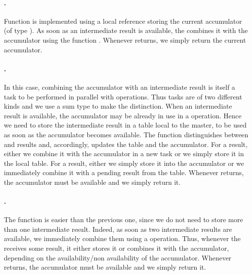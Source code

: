 \documentclass[a4paper,12pt]{article}
\begin{document}
\paragraph{.} 
Function  is implemented using a local reference
storing the current accumulator (of type ).  As soon as an
intermediate result is available, the  combines it with the
accumulator using the function . Whenever 
returns, we simply return the current accumulator.

\paragraph{.}
In this case, combining the accumulator with an intermediate result is
itself a task to be performed in parallel with  operations.
Thus tasks are of two different kinds and we use a sum type to make
the distinction.
When an intermediate  result is available, the
accumulator may be already in use in a  operation. Hence we
need to store the intermediate  result in a table local to the
master, to be
used as soon as the accumulator becomes available.
The  function distinguishes between  and 
results and, accordingly, updates the table and the accumulator. For a
 result, either we combine it with the accumulator in a new
task or we simply store it in the local table. For a  result,
either we simply store it into the accumulator or we immediately
combine it with a pending  result from the table.
Whenever  returns, the accumulator must be available and
we simply return it.

\paragraph{.}
The function  is easier than the previous one, since
we do not need to store more than one intermediate result. Indeed, as
soon as two intermediate results are available, we immediately combine
them using a  operation. Thus, whenever the 
receives some result, it either stores it or combines it with the
accumulator, depending on the availability/non availability of the
accumulator.  Whenever  returns, the accumulator must be
available and we simply return it.
\end{document}
